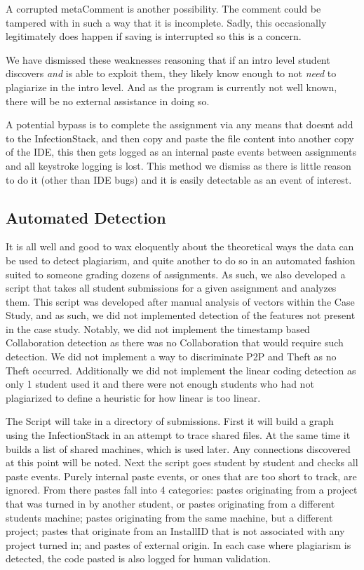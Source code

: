 \documentclass[letterpaper,10pt,conference]{IEEEtran}
\newcommand{\installID}{InstallID\xspace}
\newcommand{\metaComment}{metaComment\xspace}
\newcommand{\infectionStack}{InfectionStack\xspace}
\begin{document}
A corrupted \metaComment is another possibility.  The comment could be tampered with in such a way that it is incomplete.  Sadly, this occasionally legitimately does happen if saving is interrupted so this is a concern.                     	

We have dismissed these weaknesses reasoning that if an intro level student discovers \textit{and} is able to exploit them, they likely know enough to not \textit{need} to plagiarize in the intro level.  And as the program is currently not well known, there will be no external assistance in doing so.

A potential bypass is to complete the assignment via any means that doesnt add to the \infectionStack, and then copy and paste the file content into another copy of the IDE, this then gets logged as an internal paste events between assignments and all keystroke logging is lost.  This method we dismiss as there is little reason to do it (other than IDE bugs) and it is easily detectable as an event of interest.
\subsection{Automated Detection}
It is all well and good to wax eloquently about the theoretical ways the data can be used to detect plagiarism, and quite another to do so in an automated fashion suited to someone grading dozens of assignments.  As such, we also developed a script that takes all student submissions for a given assignment and analyzes them.  This script was developed after manual analysis of vectors within the Case Study, and as such, we did not implemented detection of the features not present in the case study.  Notably, we did not implement the timestamp based Collaboration detection as there was no Collaboration that would require such detection.  We did not implement a way to discriminate P2P and Theft as no Theft occurred. Additionally we did not implement the linear coding detection as only 1 student used it and there were not enough students who had not plagiarized to define a heuristic for how linear is too linear.  

The Script will take in a directory of submissions.  First it will build a graph using the \infectionStack in an attempt to trace shared files.  At the same time it builds a list of shared machines, which is used later.  Any connections discovered at this point will be noted.  Next the script goes student by student and checks all paste events.  Purely internal paste events, or ones that are too short to track, are ignored.  From there pastes fall into 4 categories:  pastes originating from a project that was turned in by another student, or pastes originating from a different students machine; pastes originating from the same machine, but a different project; pastes that originate from an \installID that is not associated with any project turned in; and pastes of external origin.  In each case where plagiarism is detected, the code pasted is also logged for human validation.
\end{document}
